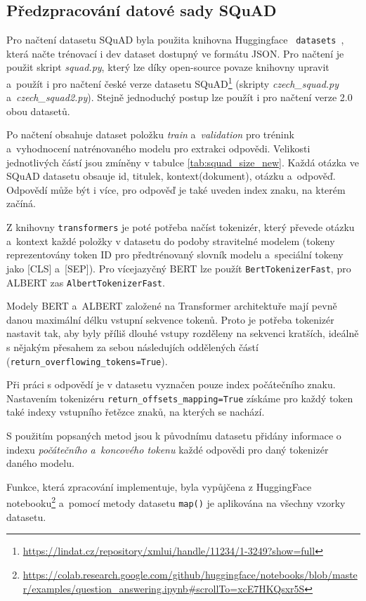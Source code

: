 \subsection{Předzpracování datové sady SQuAD}
Pro načtení datasetu SQuAD byla použita knihovna Huggingface \texttt{ datasets }, která načte trénovací i dev dataset dostupný ve formátu JSON. Pro načtení je použit skript \emph{squad.py}, který lze díky open-source povaze knihovny upravit a~použít i pro načtení české verze datasetu SQuAD\footnote{\url{https://lindat.cz/repository/xmlui/handle/11234/1-3249?show=full}} (skripty \emph{czech\_squad.py} a~\emph{czech\_squad2.py}). Stejně jednoduchý postup lze použít i pro načtení verze 2.0 obou datasetů.\par
Po načtení obsahuje dataset položku \emph{train} a~\emph{validation} pro trénink a~vyhodnocení natrénovaného modelu pro extrakci odpovědi. Velikosti jednotlivých částí jsou zmíněny v tabulce \ref{tab:squad_size_new}. Každá otázka ve SQuAD datasetu obsauje id, titulek, kontext(dokument), otázku a~odpověď. Odpovědí může být i více, pro odpověď je také uveden index znaku, na kterém začíná.\par
Z knihovny \texttt{transformers} je poté potřeba načíst tokenizér, který převede otázku a~kontext každé položky v datasetu do podoby stravitelné modelem (tokeny reprezentovány token ID pro předtrénovaný slovník modelu a~speciální tokeny jako [CLS] a~[SEP]). Pro více\-jazyčný BERT lze použít \texttt{BertTokenizerFast}, pro ALBERT zas \texttt{AlbertTokenizerFast}.\par
\pagebreak
Modely BERT a~ALBERT založené na Transformer architektuře mají pevně danou maximální délku vstupní sekvence tokenů. Proto je potřeba tokenizér nastavit tak, aby byly příliš dlouhé vstupy rozděleny na sekvenci kratších, ideálně s nějakým přesahem za sebou následujích oddělených částí (\texttt{return\_overflowing\_tokens=True}).\par
Při práci s odpovědí je v datasetu vyznačen pouze index počátečního znaku. Nastavením tokenizéru \texttt{return\_offsets\_mapping=True} získáme pro každý token také indexy vstupního řetězce znaků, na kterých se nachází.\par
S použitím popsaných metod jsou k původnímu datasetu přidány informace o indexu \emph{počátečního a~koncového tokenu} každé odpovědi pro daný tokenizér daného modelu.\par 
Funkce, která zpracování implementuje, byla vypůjčena z HuggingFace notebooku\footnote{\url{https://colab.research.google.com/github/huggingface/notebooks/blob/master/examples/question\_answering.ipynb\#scrollTo=xcE7HKQsxr5S}} a~pomocí metody datasetu \texttt{map()} je aplikována na všechny vzorky datasetu.

